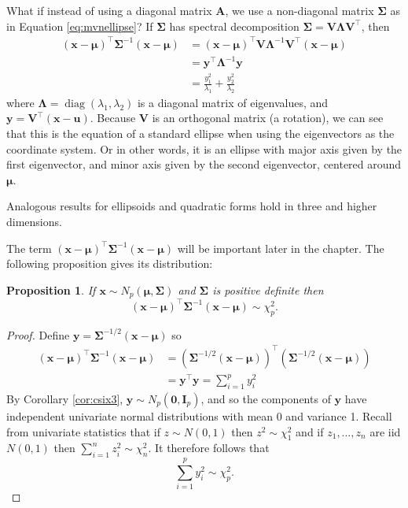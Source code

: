 \documentclass[
]{book}
\newtheorem{proposition}{Proposition}[chapter]
\theoremstyle{definition}
\theoremstyle{definition}
\theoremstyle{definition}
\theoremstyle{definition}
\theoremstyle{remark}
\begin{document}
What if instead of using a diagonal matrix \(\mathbf A\), we use a non-diagonal matrix \(\boldsymbol{\Sigma}\) as in Equation \eqref{eq:mvnellipse}? If \(\boldsymbol{\Sigma}\) has spectral decomposition
\(\boldsymbol{\Sigma}= \mathbf V\boldsymbol \Lambda\mathbf V^\top\), then
\begin{align*}
(\mathbf x-{\boldsymbol{\mu}})^\top {\boldsymbol{\Sigma}}^{-1}(\mathbf x-{\boldsymbol{\mu}}) &= (\mathbf x-{\boldsymbol{\mu}})^\top \mathbf V\boldsymbol \Lambda^{-1}\mathbf V^\top(\mathbf x-{\boldsymbol{\mu}}) \\
&= \mathbf y^\top \boldsymbol \Lambda^{-1}\mathbf y\\
&= \frac{y_1^2}{\lambda_1}+\frac{y_2^2}{\lambda_2}
\end{align*}
where \(\boldsymbol \Lambda=\operatorname{diag}(\lambda_1, \lambda_2)\) is a diagonal matrix of eigenvalues, and \(\mathbf y= \mathbf V^\top (\mathbf x-\mathbf u)\). Because \(\mathbf V\) is an orthogonal matrix (a rotation), we can see that this is the equation of a standard ellipse when using the eigenvectors as the coordinate system. Or in other words, it is an ellipse
with major axis given by the first eigenvector, and minor axis given by the second eigenvector, centered around \({\boldsymbol{\mu}}\).

Analogous results for ellipsoids and quadratic forms hold in three and higher dimensions.

The term \((\mathbf x-{\boldsymbol{\mu}})^\top \boldsymbol{\Sigma}^{-1} (\mathbf x-{\boldsymbol{\mu}})\)
will be important later in the chapter. The following proposition gives its distribution:

\begin{proposition}
\protect\hypertarget{prp:six5}{}\label{prp:six5}If \(\mathbf x\sim N_p({\boldsymbol{\mu}}, \boldsymbol{\Sigma})\) and \(\boldsymbol{\Sigma}\) is positive definite then
\[(\mathbf x-{\boldsymbol{\mu}})^\top \boldsymbol{\Sigma}^{-1} (\mathbf x-{\boldsymbol{\mu}}) \sim \chi_p^2.\]
\end{proposition}

\begin{proof}
Define \(\mathbf y= \boldsymbol{\Sigma}^{-1/2} (\mathbf x-{\boldsymbol{\mu}})\) so
\begin{align*}
(\mathbf x-{\boldsymbol{\mu}})^\top \boldsymbol{\Sigma}^{-1} (\mathbf x-{\boldsymbol{\mu}}) &= \left(\boldsymbol{\Sigma}^{-1/2} (\mathbf x-{\boldsymbol{\mu}}) \right)^\top \left(\boldsymbol{\Sigma}^{-1/2} (\mathbf x-{\boldsymbol{\mu}}) \right)\\
&= \mathbf y^\top \mathbf y= \sum_{i=1}^p y_i^2
\end{align*}
By Corollary \ref{cor:csix3}, \(\mathbf y\sim N_p ({\boldsymbol 0}, \mathbf I_p)\), and so the components of \(\mathbf y\) have independent univariate normal distributions with mean 0 and variance 1. Recall from univariate statistics that if \(z \sim N(0,1)\) then \(z^2 \sim \chi^2_1\) and if \(z_1, \ldots, z_n\) are iid \(N(0,1)\) then \(\sum_{i=1}^n z_i^2 \sim \chi_n^2\). It therefore follows that \[\sum_{i=1}^p y_i^2 \sim \chi^2_p.\]
\end{proof}
\end{document}
